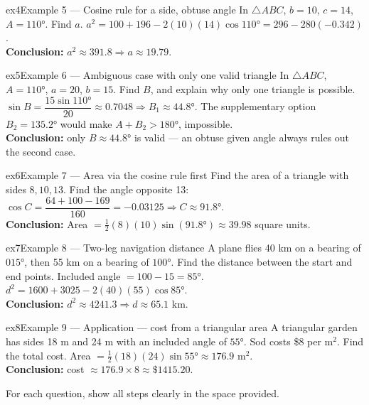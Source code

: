 \documentclass[11pt]{article}
\begin{document}
\begin{example}{ex4}{Example 5 --- Cosine rule for a side, obtuse angle}
In $\triangle ABC$, $b=10$, $c=14$, $A=110°$. Find $a$.\soln
$a^2=100+196-2(10)(14)\cos110°=296-280(-0.342)$.\\[3pt]\textbf{Conclusion:} $a^2\approx391.8\Rightarrow a\approx19.79$.
\end{example}

\begin{example}{ex5}{Example 6 --- Ambiguous case with only one valid triangle}
In $\triangle ABC$, $A=110°$, $a=20$, $b=15$. Find $B$, and explain why only one triangle is possible.\soln
$\sin B=\dfrac{15\sin110°}{20}\approx0.7048\Rightarrow B_1\approx44.8°$. The supplementary option $B_2=135.2°$ would make $A+B_2>180°$, impossible.\\[3pt]\textbf{Conclusion:} only $B\approx44.8°$ is valid --- an obtuse given angle always rules out the second case.
\end{example}

\begin{example}{ex6}{Example 7 --- Area via the cosine rule first}
Find the area of a triangle with sides $8,10,13$.\soln
Find the angle opposite 13: $\cos C=\dfrac{64+100-169}{160}=-0.03125\Rightarrow C\approx91.8°$.\\[3pt]\textbf{Conclusion:} Area $=\tfrac12(8)(10)\sin(91.8°)\approx39.98$ square units.
\end{example}

\begin{example}{ex7}{Example 8 --- Two-leg navigation distance}
A plane flies 40 km on a bearing of $015°$, then 55 km on a bearing of $100°$. Find the distance between the start and end points.\soln
Included angle $=100-15=85°$. $d^2=1600+3025-2(40)(55)\cos85°$.\\[3pt]\textbf{Conclusion:} $d^2\approx4241.3\Rightarrow d\approx65.1$ km.
\end{example}

\begin{example}{ex8}{Example 9 --- Application --- cost from a triangular area}
A triangular garden has sides 18 m and 24 m with an included angle of $55°$. Sod costs \$8 per m$^2$. Find the total cost.\soln
Area $=\tfrac12(18)(24)\sin55°\approx176.9\text{ m}^2$.\\[3pt]\textbf{Conclusion:} cost $\approx176.9\times8\approx\$1415.20$.
\end{example}

\clearpage
{}
For each question, show all steps clearly in the space provided.
\end{document}
